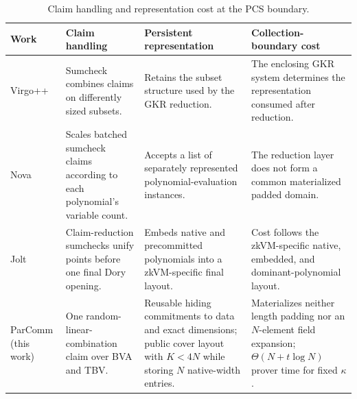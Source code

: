 \begin{table}[!t]
\centering
\small
\caption{Claim handling and representation cost at the PCS boundary.}
\label{tab:compare}
\begin{tabular}{@{}p{}p{}p{}p{}@{}}
\toprule
Work & Claim handling & Persistent representation & Collection-boundary cost \\
\midrule
Virgo++~\cite{iacr/ZhangLWWZSXZ20}
& Sumcheck combines claims on differently sized subsets.
& Retains the subset structure used by the GKR reduction.
& The enclosing GKR system determines the representation consumed after reduction. \\
\addlinespace
Nova~\cite{iacr/KothapalliST21,software/NovaHeterogeneous26}
& Scales batched sumcheck claims according to each polynomial's variable count.
& Accepts a list of separately represented polynomial-evaluation instances.
& The reduction layer does not form a common materialized padded domain. \\
\addlinespace
Jolt~\cite{iacr/ArunST23,software/JoltBookOpening26}
& Claim-reduction sumchecks unify points before one final Dory opening.
& Embeds native and precommitted polynomials into a zkVM-specific final layout.
& Cost follows the zkVM-specific native, embedded, and dominant-polynomial layout. \\
\addlinespace
ParComm (this work)
& One random-linear-combination claim over BVA and TBV.
& Reusable hiding commitments to data and exact dimensions; public cover layout
with $K<4N$ while storing $N$ native-width entries.
& Materializes neither length padding nor an $N$-element field expansion;
$\Theta(N+t\log N)$ prover time for fixed $\kappa$. \\
\bottomrule
\end{tabular}
\end{table}

